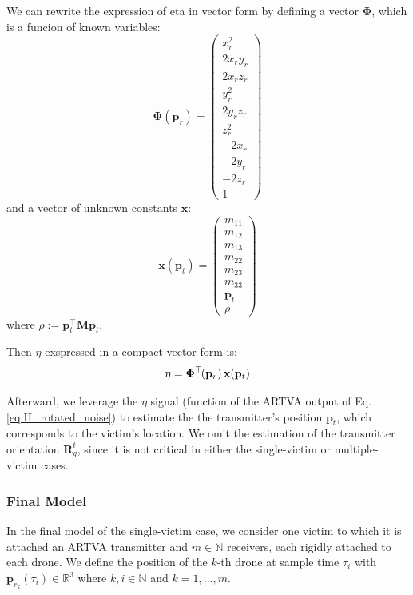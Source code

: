 \noindent
We can rewrite the expression of eta in vector form by defining a vector $\mathbf{\Phi}$,
which is a funcion of known variables:
\begin{equation}
\renewcommand{\arraystretch}{1}
\mathbf{\Phi}(\mathbf{p}_{r}) = 
\begin{pmatrix}
x_r^2 \\
2x_r y_r \\
2x_r z_r \\
y_r^2 \\
2y_r z_r \\
z_r^2 \\
-2x_r \\
-2y_r \\
-2z_r \\
1
\end{pmatrix}
\label{eq:Phi_vector}
\end{equation}
and a vector of unknown constants $\mathbf{x}$:
\begin{equation}
\renewcommand{\arraystretch}{1}
\mathbf{x}(\mathbf{p}_t) = 
\begin{pmatrix}
m_{11} \\
m_{12} \\
m_{13} \\
m_{22} \\
m_{23} \\
m_{33} \\
\mathbf{p}_t \\
\rho
\end{pmatrix}
\label{eq:x_vector}
\end{equation}  
where \( \rho := \mathbf{p}_t^\top \mathbf{M} \mathbf{p}_t \).

\noindent
Then $\eta$ exspressed in a compact vector form is:
\begin{equation}
    \eta = \mathbf{\Phi}^\top\mkern-2mu(\mathbf{p}_{r}) \, \mathbf{x}(\mathbf{p}_t)
    \label{eq:eta_final_final}
\end{equation}

\noindent
Afterward, we leverage the $\eta$ signal (function of the ARTVA output
of Eq. \ref{eq:H_rotated_noise}) to estimate the
the transmitter’s position \( \mathbf{p}_t \), which corresponds to the victim's location. 
We omit the estimation of the transmitter orientation \( \mathbf{R}_g^t \),
since it is not critical in either the single-victim or multiple-victim cases.

\subsubsection{Final Model}
\noindent
In the final model of the single-victim case, we consider one victim to 
which it is attached an ARTVA transmitter and \( m \in \mathbb{N} \) receivers, 
each rigidly attached to each drone. 
We define the position of the $k$-th drone at sample time \( \tau_i \) with \( \mathbf{p}_{r_k}(\tau_i) \in \mathbb{R}^3 \) 
where \( k, i \in \mathbb{N} \) and \( k = 1, \ldots, m \).

